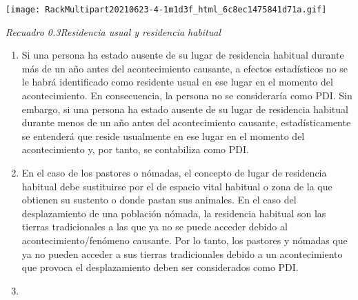 \documentclass[
]{book}
\begin{document}
\texttt{[image: RackMultipart20210623-4-1m1d3f\_html\_6c8ec1475841d71a.gif]}

\emph{Recuadro 0.3Residencia usual y residencia habitual}

\begin{enumerate}
\def\labelenumi{\arabic{enumi}.}
\item
  Si una persona ha estado ausente de su lugar de residencia habitual durante más de un año antes del acontecimiento causante, a efectos estadísticos no se le habrá identificado como residente usual en ese lugar en el momento del acontecimiento. En consecuencia, la persona no se consideraría como PDI. Sin embargo, si una persona ha estado ausente de su lugar de residencia habitual durante menos de un año antes del acontecimiento causante, estadísticamente se entenderá que reside usualmente en ese lugar en el momento del acontecimiento y, por tanto, se contabiliza como PDI.
\item
  En el caso de los pastores o nómadas, el concepto de lugar de residencia habitual debe sustituirse por el de espacio vital habitual o zona de la que obtienen su sustento o donde pastan sus animales. En el caso del desplazamiento de una población nómada, la residencia habitual son las tierras tradicionales a las que ya no se puede acceder debido al acontecimiento/fenómeno causante. Por lo tanto, los pastores y nómadas que ya no pueden acceder a sus tierras tradicionales debido a un acontecimiento que provoca el desplazamiento deben ser considerados como PDI.
\item ~
  \hypertarget{han-estado-viviendo-fuxedsicamente-fuera-de-la-vivienda-en-la-que-vivuxedan-en-el-momento-del-acontecimiento-causante}{%
}
\end{enumerate}
\end{document}
